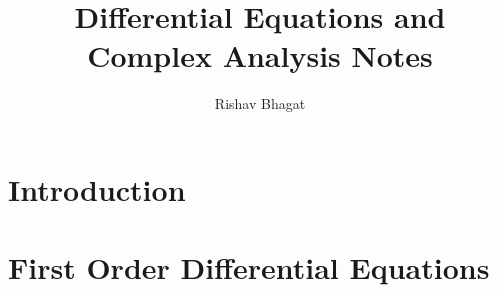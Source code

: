 \title{Differential Equations and Complex Analysis Notes}

\author{Rishav Bhagat}

\maketitle
\chapter{Introduction}
    
\chapter{First Order Differential Equations}